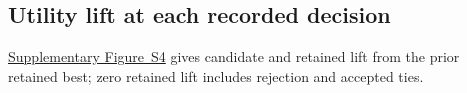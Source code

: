 \subsection{Utility lift at each recorded decision}\label{app:recorded-decision-lift}

\href{eurekazero_supplement.pdf#supp-recorded-decision-lift}{Supplementary Figure~S4} gives candidate
and retained lift from the prior retained best; zero retained lift includes
rejection and accepted ties.
